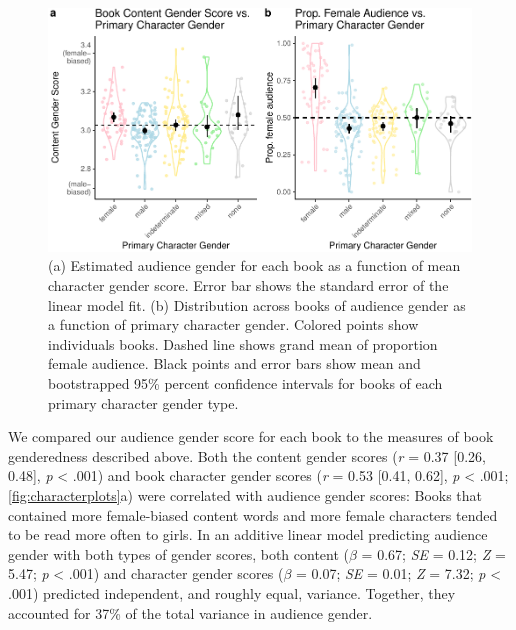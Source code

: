 \documentclass[
  english,
  ,man,floatsintext]{apa6}
\begin{document}
\begin{figure}[t!]
\includegraphics[width=\textwidth,]{kidbookgender_psych_sci_files/figure-latex/characterplots-1} \caption{(a) Estimated audience gender for each book as a function of mean character gender score. Error bar shows the standard error of the linear model fit. (b) Distribution across books of audience gender as a function of primary character gender. Colored points show individuals books. Dashed line shows grand mean of proportion female audience. Black points and error bars show mean and bootstrapped 95\% percent confidence intervals for books of each primary character gender type.}\label{fig:characterplots}
\end{figure}

We compared our audience gender score for each book to the measures of book genderedness described above. Both the content gender scores (\emph{r} = 0.37 {[}0.26, 0.48{]}, \emph{p} \textless{} .001) and book character gender scores (\emph{r} = 0.53 {[}0.41, 0.62{]}, \emph{p} \textless{} .001; \autoref{fig:characterplots}a) were correlated with audience gender scores: Books that contained more female-biased content words and more female characters tended to be read more often to girls. In an additive linear model predicting audience gender with both types of gender scores, both content (\(\beta\) = 0.67; \emph{SE} = 0.12; \emph{Z} = 5.47; \emph{p} \textless{} .001) and character gender scores (\(\beta\) = 0.07; \emph{SE} = 0.01; \emph{Z} = 7.32; \emph{p} \textless{} .001) predicted independent, and roughly equal, variance. Together, they accounted for 37\% of the total variance in audience gender.
\end{document}
